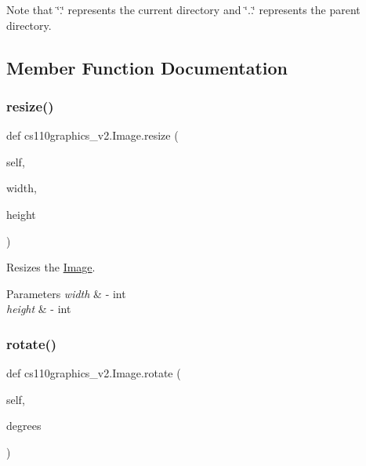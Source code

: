 Note that \char`\"{}.\char`\"{} represents the current directory and \char`\"{}..\char`\"{} represents the parent directory. 

\subsection{Member Function Documentation}
\mbox{\label{classcs110graphics__v2_1_1Image_a55c1b238c7c79d2371321cf624d9f23d}} 
\subsubsection{\texorpdfstring{resize()}{resize()}}
{\footnotesize\ttfamily def cs110graphics\+\_\+v2.\+Image.\+resize (\begin{DoxyParamCaption}\item[{}]{self,  }\item[{}]{width,  }\item[{}]{height }\end{DoxyParamCaption})}



Resizes the \mbox{\hyperlink{classcs110graphics__v2_1_1Image}{Image}}. 


\begin{DoxyParams}{Parameters}
{\em width} & -\/ int \\
\hline
{\em height} & -\/ int \\
\hline
\end{DoxyParams}
\mbox{\label{classcs110graphics__v2_1_1Image_aaa386a7e289febe8cdbed32bab605477}} 
\subsubsection{\texorpdfstring{rotate()}{rotate()}}
{\footnotesize\ttfamily def cs110graphics\+\_\+v2.\+Image.\+rotate (\begin{DoxyParamCaption}\item[{}]{self,  }\item[{}]{degrees }\end{DoxyParamCaption})}



